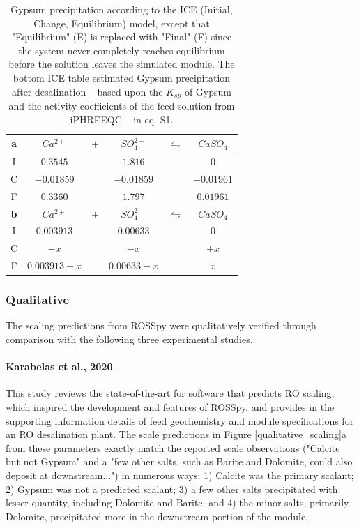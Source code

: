 \documentclass[journal=ACSES&TWater,manuscript=article]{achemso}
\begin{document}
\begin{table}
    \centering
    \begin{tabular}{c|ccccc}
      \toprule
      \textbf{a} & $Ca^{2+}$ & $+$ & $SO_4^{2-}$ & $\leftrightharpoons$ & $CaSO_4$ \\
      \midrule
      I & $0.3545$ && $1.816$ && $0$ \\
      C & $-0.01859$ && $-0.01859$ && $+0.01961$ \\
      F & $0.3360$ && $1.797$ && $0.01961$ \\
      \bottomrule
      
      \toprule
      \textbf{b} & $Ca^{2+}$ & $+$ & $SO_4^{2-}$ & $\leftrightharpoons$ & $CaSO_4$ \\
      \midrule
      I & $0.003913$ && $0.00633$ && $0$ \\
      C & $-x$ && $-x$ && $+x$ \\
      F & $0.003913-x$ && $0.00633-x$ && $x$ \\
      \bottomrule
    \end{tabular}
    \caption{
        Gypsum precipitation according to the ICE (Initial, Change, Equilibrium) model, except that "Equilibrium" (E) is replaced with "Final" (F) since the system never completely reaches equilibrium before the solution leaves the simulated module. The bottom ICE table estimated Gypsum precipitation after desalination -- based upon the $K_{sp}$ of Gypsum and the activity coefficients of the feed solution from iPHREEQC -- in eq. S1. 
      }
    \label{gypsum_ice_table}
\end{table}

\subsubsection{Qualitative}
The scaling predictions from ROSSpy were qualitatively verified through comparison with the following three experimental studies. 

\paragraph{Karabelas et al., 2020 \cite{Karabelas2020ScalingTools}}
This study reviews the state-of-the-art for software that predicts RO scaling, which inspired the development and features of ROSSpy, and provides in the supporting information details of feed geochemistry and module specifications for an RO desalination plant. The scale predictions in Figure \ref{qualitative_scaling}a from these parameters exactly match the reported scale observations ("Calcite but not Gypsum" and a "few other salts, such as Barite and Dolomite, could also deposit at downstream...") in numerous ways: 1) Calcite was the primary scalant; 2) Gypsum was not a predicted scalant; 3) a few other salts precipitated with lesser quantity, including Dolomite and Barite; and 4) the minor salts, primarily Dolomite, precipitated more in the downstream portion of the module.  
\end{document}
